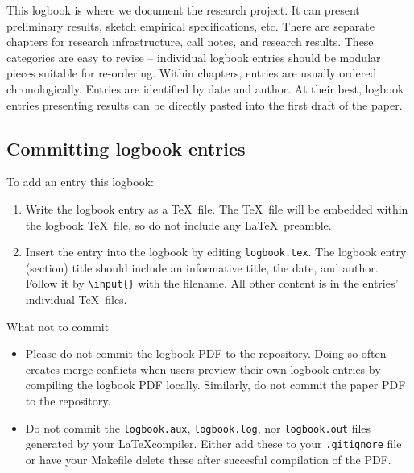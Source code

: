 
This logbook is where we document the research project.
It can present preliminary results, sketch empirical specifications, etc.
There are separate chapters for research infrastructure, call notes, and research results.
These categories are easy to revise -- individual logbook entries should be modular pieces suitable for re-ordering.
Within chapters, entries are usually ordered chronologically. Entries are identified by date and author.
At their best, logbook entries presenting results can be directly pasted into the first draft of the paper.

\subsection{Committing logbook entries}

To add an entry this logbook:
\begin{enumerate}
	\item Write the logbook entry as a \TeX\ file. The \TeX\ file will be embedded within the logbook \TeX\ file, so do not include any \LaTeX\ preamble.
	\item Insert the entry into the logbook by editing \texttt{logbook.tex}.
	The logbook entry (section) title should include an informative title, the date, and author.
	Follow it by \texttt{\textbackslash input\{\}} with the filename.
	All other content is in the entries' individual \TeX\ files.
\end{enumerate}

What not to commit
\begin{itemize}
	\item Please do not commit the logbook PDF to the repository.
	Doing so often creates merge conflicts when users preview their own logbook entries by compiling the logbook PDF locally.
	Similarly, do not commit the paper PDF to the repository.
	\item Do not commit the \texttt{logbook.aux}, \texttt{logbook.log}, nor \texttt{logbook.out} files generated by your \LaTeX compiler.
	Either add these to your \texttt{.gitignore} file or have your Makefile delete these after succesful compilation of the PDF.
\end{itemize}

